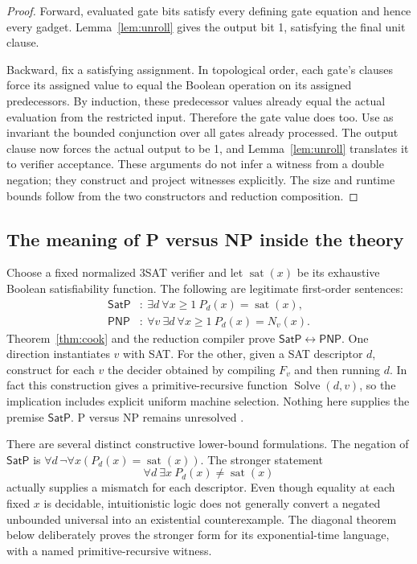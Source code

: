 \begin{proof}
Forward, evaluated gate bits satisfy every defining gate equation and hence
every gadget. Lemma~\ref{lem:unroll} gives the output bit 1, satisfying the
final unit clause.

Backward, fix a satisfying assignment. In topological order, each gate's
clauses force its assigned value to equal the Boolean operation on its
assigned predecessors. By induction, these predecessor values already equal
the actual evaluation from the restricted input. Therefore the gate value
does too. Use as invariant the bounded conjunction over all gates already
processed. The output clause now forces the actual output to be 1, and
Lemma~\ref{lem:unroll} translates it to verifier acceptance. These arguments
do not infer a witness from a double negation; they construct and project
witnesses explicitly. The size and runtime bounds follow from the two
constructors and reduction composition.
\end{proof}

\subsection{The meaning of P versus NP inside the theory}

Choose a fixed normalized 3SAT verifier and let \(\operatorname{sat}(x)\)
be its exhaustive Boolean satisfiability function. The following are
legitimate first-order sentences:
\begin{align*}
 \mathsf{SatP}&:\ \exists d\ \forall x\ge1\ P_d(x)=\operatorname{sat}(x),\\
 \mathsf{PNP}&:\ \forall v\ \exists d\ \forall x\ge1\ P_d(x)=N_v(x).
\end{align*}
Theorem~\ref{thm:cook} and the reduction compiler prove
\(\mathsf{SatP}\leftrightarrow\mathsf{PNP}\). One direction instantiates
\(v\) with SAT. For the other, given a SAT descriptor \(d\), construct
for each \(v\) the decider obtained by compiling \(F_v\) and then running
\(d\). In fact this construction gives a primitive-recursive function
\(\operatorname{Solve}(d,v)\), so the implication includes explicit
uniform machine selection. Nothing here supplies the premise
\(\mathsf{SatP}\). P versus NP remains unresolved \cite{ClayPNP}.

There are several distinct constructive lower-bound formulations. The
negation of \(\mathsf{SatP}\) is
\(\forall d\,\neg\forall x(P_d(x)=\operatorname{sat}(x))\). The stronger
statement
\[
 \forall d\ \exists x\ P_d(x)\ne\operatorname{sat}(x)
\]
actually supplies a mismatch for each descriptor. Even though equality at
each fixed \(x\) is decidable, intuitionistic logic does not generally
convert a negated unbounded universal into an existential counterexample.
The diagonal theorem below deliberately proves the stronger form for its
exponential-time language, with a named primitive-recursive witness.

